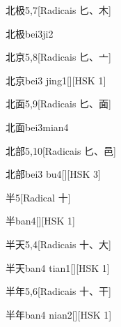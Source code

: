 \begin{entry}{北极}{5,7}[Radicais ⼔、⽊]
  \begin{phonetics}{北极}{bei3ji2}
  \end{phonetics}
\end{entry}

\begin{entry}{北京}{5,8}[Radicais ⼔、⼇]
  \begin{phonetics}{北京}{bei3 jing1}[][HSK 1]
  \end{phonetics}
\end{entry}

\begin{entry}{北面}{5,9}[Radicais ⼔、⾯]
  \begin{phonetics}{北面}{bei3mian4}
  \end{phonetics}
\end{entry}

\begin{entry}{北部}{5,10}[Radicais ⼔、⾢]
  \begin{phonetics}{北部}{bei3 bu4}[][HSK 3]
  \end{phonetics}
\end{entry}

\begin{entry}{半}{5}[Radical ⼗]
  \begin{phonetics}{半}{ban4}[][HSK 1]
  \end{phonetics}
\end{entry}

\begin{entry}{半天}{5,4}[Radicais ⼗、⼤]
  \begin{phonetics}{半天}{ban4 tian1}[][HSK 1]
  \end{phonetics}
\end{entry}

\begin{entry}{半年}{5,6}[Radicais ⼗、⼲]
  \begin{phonetics}{半年}{ban4 nian2}[][HSK 1]
  \end{phonetics}
\end{entry}

